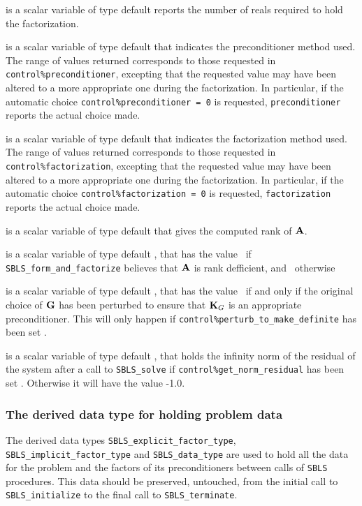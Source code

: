 \documentclass{galahad}
\newcommand{\packagename}{SBLS}
\begin{document}
\begin{description}
 is a scalar variable of type default \integer
reports the number of reals required to hold the factorization.

 is a scalar variable of type default \integer
that indicates the preconditioner method used. The range of values returned
corresponds to those requested in {\tt control\%preconditioner}, 
excepting that the requested value may have been altered to a more
appropriate one during the factorization. In particular, if the automatic
choice {\tt control\%preconditioner = 0} is requested,
{\tt preconditioner} reports the actual choice made.

 is a scalar variable of type default \integer
that indicates the factorization method used. The range of values returned
corresponds to those requested in {\tt control\%factorization}, 
excepting that the requested value may have been altered to a more
appropriate one during the factorization.
In particular, if the automatic
choice {\tt control\%factorization = 0} is requested,
{\tt factorization} reports the actual choice made.

 is a scalar variable of type default \integer that gives the
computed rank of ${\mathbf{A}}$.

 is a scalar variable of type default \logical, that has the
value \true\ if {\tt \packagename\_form\_and\_factorize} believes that
${\mathbf{A}}$ is rank defficient, and \false\ otherwise

 is a scalar variable of type default \logical, that has the
value \true\ if and only if the original choice of ${\mathbf{G}}$ has been perturbed to
ensure that ${\mathbf{K}}_G$ is an appropriate preconditioner. This will only
happen if {\tt control\-\%perturb\_to\_make\_definite} has been set \true.

 is a scalar variable of type default \realdp, 
that holds the infinity norm of the residual of the system 
after a call to {\tt \packagename\_solve} if {\tt control\%get\_norm\_residual}
has been set \true. Otherwise it will have the value -1.0.

\end{description}


\subsubsection{The derived data type for holding problem data}\label{typedata}
The derived data types 
{\tt \packagename\_explicit\_factor\_type},
{\tt \packagename\_implicit\_factor\_type} and
{\tt \packagename\_data\_type} 
are used to hold all the data for the problem and the factors of
its preconditioners between calls of 
{\tt \packagename} procedures. 
This data should be preserved, untouched, from the initial call to 
{\tt \packagename\_initialize}
to the final call to
{\tt \packagename\_terminate}.
\end{document}
